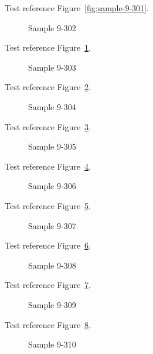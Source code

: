 Test reference Figure~\ref{fig:sample-9-301}.

\begin{figure}[tbhp]
\caption{Sample 9-302}
\label{fig:sample-9-302}
\end{figure}

Test reference Figure~\ref{fig:sample-9-302}.

\begin{figure}[tbhp]
\caption{Sample 9-303}
\label{fig:sample-9-303}
\end{figure}

Test reference Figure~\ref{fig:sample-9-303}.

\begin{figure}[tbhp]
\caption{Sample 9-304}
\label{fig:sample-9-304}
\end{figure}

Test reference Figure~\ref{fig:sample-9-304}.

\begin{figure}[tbhp]
\caption{Sample 9-305}
\label{fig:sample-9-305}
\end{figure}

Test reference Figure~\ref{fig:sample-9-305}.

\begin{figure}[tbhp]
\caption{Sample 9-306}
\label{fig:sample-9-306}
\end{figure}

Test reference Figure~\ref{fig:sample-9-306}.

\begin{figure}[tbhp]
\caption{Sample 9-307}
\label{fig:sample-9-307}
\end{figure}

Test reference Figure~\ref{fig:sample-9-307}.

\begin{figure}[tbhp]
\caption{Sample 9-308}
\label{fig:sample-9-308}
\end{figure}

Test reference Figure~\ref{fig:sample-9-308}.

\begin{figure}[tbhp]
\caption{Sample 9-309}
\label{fig:sample-9-309}
\end{figure}

Test reference Figure~\ref{fig:sample-9-309}.

\begin{figure}[tbhp]
\caption{Sample 9-310}
\label{fig:sample-9-310}
\end{figure}

